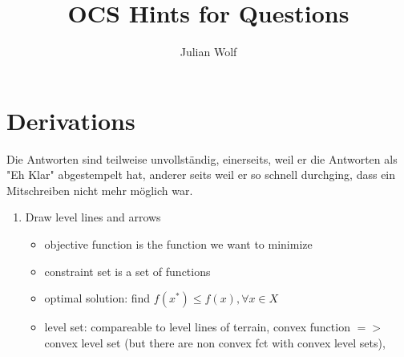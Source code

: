 \documentclass{report}
\title{OCS Hints for Questions}
\author{Julian Wolf}
\begin{document}
\maketitle
\section*{Derivations}
Die Antworten sind teilweise unvollständig, einerseits, weil er die Antworten als "Eh Klar" abgestempelt hat, anderer seits weil er so schnell durchging, dass ein Mitschreiben nicht mehr möglich war. 

\begin{enumerate}
\item Draw level lines and arrows
\begin{itemize}
\item objective function is the function we want to minimize
\item constraint set is a set of functions
\item optimal solution: find $f(x^*) \leq f(x), \forall x \in X$
\item level set: compareable to level lines of terrain, convex function $=>$ convex level set (but there are non convex fct with convex level sets), 
\end{itemize}


\end{enumerate}
\end{document}

